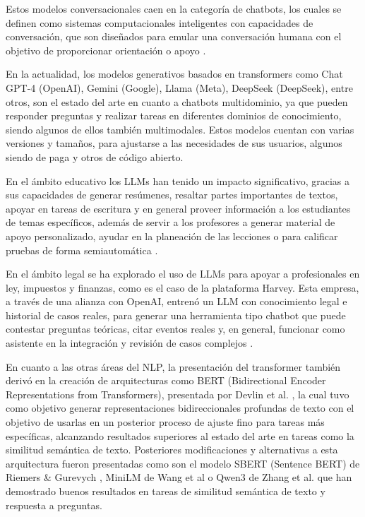 Estos modelos conversacionales caen en la categoría de chatbots, los cuales se
definen como sistemas computacionales inteligentes con capacidades de conversación,
que son diseñados para emular una conversación humana con el objetivo de
proporcionar orientación o apoyo \cite{caldarini_literature_2022}.

En la actualidad, los modelos generativos basados en transformers como Chat GPT-4
(OpenAI), Gemini (Google), Llama (Meta), DeepSeek (DeepSeek), entre otros, son el
estado del arte en cuanto a chatbots multidominio, ya que pueden responder preguntas
y realizar tareas en diferentes dominios de conocimiento, siendo algunos de ellos
también multimodales. Estos modelos cuentan con varias versiones y tamaños, para
ajustarse a las necesidades de sus usuarios, algunos siendo de paga y otros de
código abierto.

En el ámbito educativo los LLMs han tenido un impacto significativo,
gracias a sus capacidades de generar resúmenes, resaltar partes
importantes de textos, apoyar en tareas de escritura y en general proveer información
a los estudiantes de temas específicos, además de servir a los profesores a generar
material de apoyo personalizado, ayudar en la planeación de las lecciones o para
calificar pruebas de forma semiautomática \cite{kasneci_chatgpt_2023}.

En el ámbito legal se ha explorado el uso de LLMs para apoyar a profesionales
en ley, impuestos y finanzas, como es el caso de la plataforma Harvey.
Esta empresa, a través de una alianza con OpenAI, entrenó un LLM con conocimiento
legal e historial de casos reales, para generar una herramienta tipo chatbot
que puede contestar preguntas teóricas, citar eventos reales y, en general,
funcionar como asistente en la integración y revisión
de casos complejos \cite{openai_customizing_2024}.

En cuanto a las otras áreas del NLP, la presentación del transformer también
derivó en la creación de arquitecturas como BERT (Bidirectional Encoder
Representations from Transformers), presentada por Devlin et al.
\cite{devlin_bert_2019}, la cual tuvo como objetivo generar representaciones
bidireccionales profundas de texto con el objetivo de usarlas en un posterior
proceso de ajuste fino para tareas más específicas, alcanzando resultados
superiores al estado del arte en tareas como la similitud semántica de texto.
Posteriores modificaciones y alternativas a esta arquitectura fueron presentadas
como son el modelo SBERT (Sentence BERT) de Riemers \& Gurevych
\cite{reimers_sentence-bert_2019}, MiniLM de Wang et al \cite{wang_minilm_2020}
o Qwen3 de Zhang et al. \cite{zhang_qwen3_2025} que han demostrado buenos
resultados en tareas de similitud semántica de texto y respuesta a preguntas.

